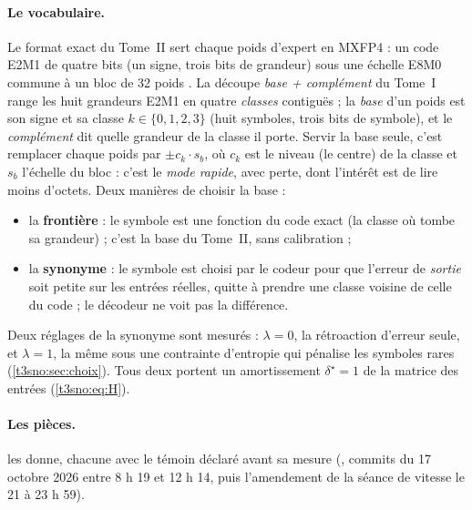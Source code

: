 \paragraph{Le vocabulaire.} Le format exact du Tome~II sert chaque poids d'expert en MXFP4 : un code E2M1 de quatre bits (un signe, trois bits de grandeur) sous une échelle E8M0 commune à un bloc de 32 poids \parencite{ocp_mx_v1}. La découpe \emph{base + complément} du Tome~I range les huit grandeurs E2M1 en quatre \emph{classes} contiguës ; la \emph{base} d'un poids est son signe et sa classe $k \in \{0,1,2,3\}$ (huit symboles, trois bits de symbole), et le \emph{complément} dit quelle grandeur de la classe il porte. Servir la base seule, c'est remplacer chaque poids par $\pm c_k \cdot s_b$, où $c_k$ est le niveau (le centre) de la classe et $s_b$ l'échelle du bloc : c'est le \emph{mode rapide}, avec perte, dont l'intérêt est de lire moins d'octets. Deux manières de choisir la base :
\begin{itemize}
\item la \textbf{frontière} : le symbole est une fonction du code exact (la classe où tombe sa grandeur) ; c'est la base du Tome~II, sans calibration ;
\item la \textbf{synonyme} : le symbole est choisi par le codeur pour que l'erreur de \emph{sortie} soit petite sur les entrées réelles, quitte à prendre une classe voisine de celle du code ; le décodeur ne voit pas la différence.
\end{itemize}
Deux réglages de la synonyme sont mesurés : $\lambda = 0$, la rétroaction d'erreur seule, et $\lambda = 1$, la même sous une contrainte d'entropie qui pénalise les symboles rares (\cref{t3sno:sec:choix}). Tous deux portent un amortissement $\delta^\star = 1$ de la matrice des entrées (\cref{t3sno:eq:H}).

\paragraph{Les pièces.}  les donne, chacune avec le témoin déclaré avant sa mesure (, commits du 17 octobre 2026 entre 8 h 19 et 12 h 14, puis l'amendement de la séance de vitesse le 21 à 23 h 59).

